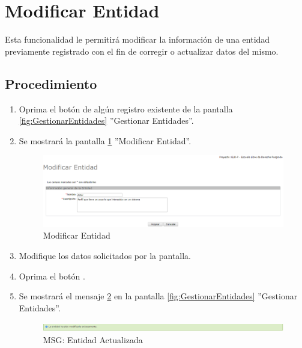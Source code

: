\hypertarget{cv:modificarEntidad}{\section{Modificar Entidad}} \label{sec:modificarEntidad}

	Esta funcionalidad le permitirá modificar la información de una entidad previamente registrado con el fin de corregir o actualizar datos del mismo. 

		\subsection{Procedimiento}

			\begin{enumerate}
	
			\item Oprima el botón \IUEditar{} de algún registro existente de la pantalla \ref{fig:GestionarEntidades} ''Gestionar Entidades''.
	
			\item Se mostrará la pantalla \ref{fig:modificarEntidad} ''Modificar Entidad''.
			
			\begin{figure}[htbp!]
				\begin{center}
					\includegraphics[scale=0.5]{roles/lider/entidades/pantallas/IU12-2modificarEntidad}
					\caption{Modificar Entidad}
					\label{fig:modificarEntidad}
				\end{center}
			\end{figure}
		
			\item Modifique los datos solicitados por la pantalla.
						
			\item Oprima el botón \IUAceptar.
			
			\item Se mostrará el mensaje \ref{fig:entidadModificada} en la pantalla \ref{fig:GestionarEntidades} ''Gestionar Entidades''.
			
			\begin{figure}[htbp!]
				\begin{center}
					\includegraphics[scale=0.5]{roles/lider/entidades/pantallas/IU12-2MSG1}
					\caption{MSG: Entidad Actualizada}
					\label{fig:entidadModificada}
				\end{center}
			\end{figure}
			\end{enumerate}